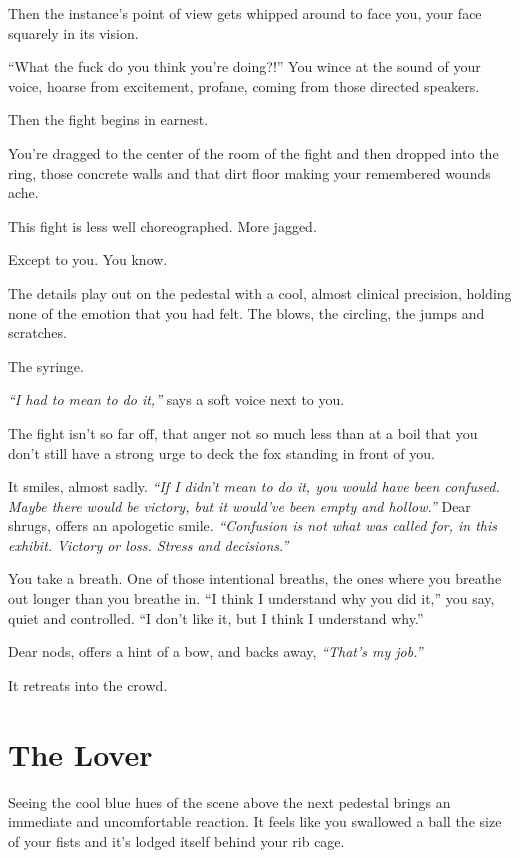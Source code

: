 Then the instance's point of view gets whipped around to face you, your face squarely in its vision.

``What the fuck do you think you're doing?!'' You wince at the sound of your voice, hoarse from excitement, profane, coming from those directed speakers.

Then the fight begins in earnest.

You're dragged to the center of the room of the fight and then dropped into the ring, those concrete walls and that dirt floor making your remembered wounds ache.

This fight is less well choreographed. More jagged.

Except to you. You know.

The details play out on the pedestal with a cool, almost clinical precision, holding none of the emotion that you had felt. The blows, the circling, the jumps and scratches.

The syringe.

\emph{``I had to mean to do it,''} says a soft voice next to you.

The fight isn't so far off, that anger not so much less than at a boil that you don't still have a strong urge to deck the fox standing in front of you.

It smiles, almost sadly. \emph{``If I didn't mean to do it, you would have been confused. Maybe there would be victory, but it would've been empty and hollow.''} Dear shrugs, offers an apologetic smile. \emph{``Confusion is not what was called for, in this exhibit. Victory or loss. Stress and decisions.''}

You take a breath. One of those intentional breaths, the ones where you breathe out longer than you breathe in. ``I think I understand why you did it,'' you say, quiet and controlled. ``I don't like it, but I think I understand why.''

Dear nods, offers a hint of a bow, and backs away, \emph{``That's my job.''}

It retreats into the crowd.

\newpage
\section*{The Lover}

Seeing the cool blue hues of the scene above the next pedestal brings an immediate and uncomfortable reaction. It feels like you swallowed a ball the size of your fists and it's lodged itself behind your rib cage.

